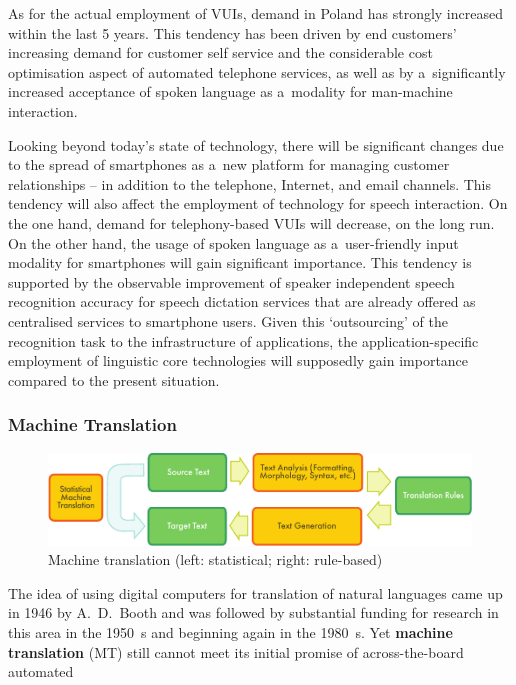 \begin{multicols}{2}
As for the actual employment of VUIs, demand in Poland has strongly
increased within the last 5 years. This tendency has been driven by
end customers’ increasing demand for customer self service and the
considerable cost optimisation aspect of automated telephone services,
as well as by a~significantly increased acceptance of spoken language
as a~modality for man-machine interaction. 

Looking beyond today’s state of technology, there will be
significant changes due to the spread of smartphones as a~new platform
for managing customer relationships – in addition to the telephone,
Internet, and email channels. This tendency will also affect the
employment of technology for speech interaction. On the one hand,
demand for telephony-based VUIs will decrease, on the long run. On the
other hand, the usage of spoken language as a~user-friendly input
modality for smartphones will gain significant importance. This
tendency is supported by the observable improvement of speaker
independent speech recognition accuracy for speech dictation services
that are already offered as centralised services to smartphone users.
Given this ‘outsourcing’ of the recognition task to the
infrastructure of applications, the application-specific employment of
linguistic core technologies will supposedly gain importance compared
to the present situation. 

\subsubsection{Machine Translation} 

\begin{figure}[htb]  \center
\includegraphics[width=\textwidth]{../_media/english/machine_translation}
\caption{Machine translation (left: statistical; right: rule-based)}
\label{fig:mtarch_en} 
\end{figure} 

The idea of using digital computers for translation of natural
languages came up in 1946 by A.~D.~Booth and was followed by
substantial funding for research in this area in the 1950~s and
beginning again in the 1980~s. Yet \textbf{machine translation} (MT)
still cannot meet its initial promise of across-the-board automated


\end{multicols}
